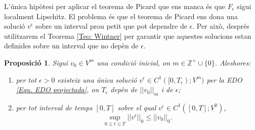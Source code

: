\documentclass{article}
\numberwithin{equation}{section}
\newtheorem{proposicio}{Proposici\'{o}}[section]
\begin{document}
L'\'{u}nica hip\`{o}tesi per aplicar el teorema de Picard que ens manca \'{e}s que $F_{\epsilon}$ sigui localment Lipschitz. El problema \'{e}s que el teorema de Picard ens dona una soluci\'{o} $v^{\epsilon}$ sobre un interval prou petit que pot dependre de $\epsilon$. Per aix\`{o}, despr\'{e}s utilitzarem el Teorema \ref{Teo: Wintner} per garantir que aquestes solucions estan definides sobre un interval que no dep\`{e}n de $\epsilon$.

\begin{proposicio}\label{Pro: existencia suavitzada}
Sigui $v_0\in V^m$ una condici\'{o} inicial, on $m\in\mathbb{Z}^+\cup\{0\}$. Aleshores:
\begin{enumerate}
\item\label{Pro: existencia suavitzada 1} per tot $\epsilon>0$ existeix una \'{u}nica soluci\'{o} $v^{\epsilon}\in C^1([0,T_{\epsilon});V^m)$ per la EDO \eqref{Equ. EDO projectada}, on $T_{\epsilon}$ dep\`{e}n de $||v_0||_m$ i de $\epsilon$;
\item per tot interval de temps $[0,T]$ sobre el qual $v^{\epsilon}\in C^1([0,T];V^0)$,
\begin{equation}\label{Equ. fita energia}
\sup_{0\leq t\leq T}||v^{\epsilon}||_0\leq||v_0||_0.
\end{equation}
\end{enumerate}
\end{proposicio}
\end{document}
